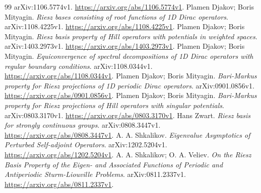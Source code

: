 \documentclass[12pt,a4paper]{article}
\begin{document}
\begin{thebibliography}{99}
arXiv:1106.5774v1. \url{https://arxiv.org/abs/1106.5774v1}.
Plamen Djakov; Boris Mityagin. \emph{Riesz bases consisting of root functions of 1D Dirac operators}.
arXiv:1108.4225v1. \url{https://arxiv.org/abs/1108.4225v1}.
Plamen Djakov; Boris Mityagin. \emph{Riesz basis property of Hill operators with potentials in weighted spaces}.
arXiv:1403.2973v1. \url{https://arxiv.org/abs/1403.2973v1}.
Plamen Djakov; Boris Mityagin. \emph{Equiconvergence of spectral decompositions of 1D Dirac operators with regular boundary conditions}.
arXiv:1108.0344v1. \url{https://arxiv.org/abs/1108.0344v1}.
Plamen Djakov; Boris Mityagin. \emph{Bari-Markus property for Riesz projections of 1D periodic Dirac operators}.
arXiv:0901.0856v1. \url{https://arxiv.org/abs/0901.0856v1}.
Plamen Djakov; Boris Mityagin. \emph{Bari-Markus property for Riesz projections of Hill operators with singular potentials}.
arXiv:0803.3170v1. \url{https://arxiv.org/abs/0803.3170v1}.
Hans Zwart. \emph{Riesz basis for strongly continuous groups}.
arXiv:0808.3447v1. \url{https://arxiv.org/abs/0808.3447v1}.
A. A. Shkalikov. \emph{Eigenvalue Asymptotics of Perturbed Self-adjoint Operators}.
arXiv:1202.5204v1. \url{https://arxiv.org/abs/1202.5204v1}.
A. A. Shkalikov; O. A. Veliev. \emph{On the Riesz Basis Property of the Eigen- and Associated Functions of Periodic and Antiperiodic Sturm-Liouville Problems}.
arXiv:0811.2337v1. \url{https://arxiv.org/abs/0811.2337v1}.
\end{thebibliography}
\end{document}
